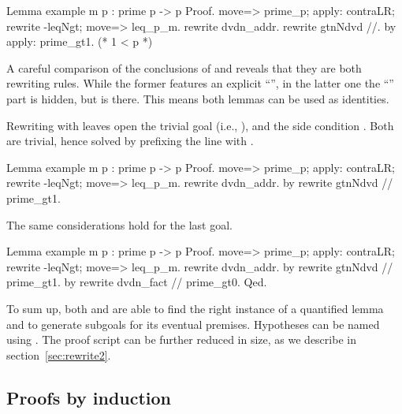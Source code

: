 \begin{coq}{}{}
Lemma example m p : prime p -> p %
Proof.
move=> prime_p; apply: contraLR; rewrite -leqNgt; move=> leq_p_m.
rewrite dvdn_addr.
  rewrite gtnNdvd //.
  by apply: prime_gt1.  (* 1 < p *)
\end{coq}
A careful comparison of the conclusions of 
and  reveals that they are both rewriting rules.  While
the former features an explicit ``'', in the
latter one the ``'' part is hidden, but is there.
This means
both lemmas can be used as identities.


Rewriting with
 leaves open the trivial goal  (i.e., ),
and the side condition .  Both are trivial, hence
solved by prefixing the line with .

\begin{coq}{}{}
Lemma example m p : prime p -> p %
Proof.
move=> prime_p; apply: contraLR; rewrite -leqNgt; move=> leq_p_m.
rewrite dvdn_addr.
  by rewrite gtnNdvd // prime_gt1.
\end{coq}
The same considerations hold for the last goal.

\begin{coq}{}{}
Lemma example m p : prime p -> p %
Proof.
move=> prime_p; apply: contraLR; rewrite -leqNgt; move=> leq_p_m.
rewrite dvdn_addr.
  by rewrite gtnNdvd // prime_gt1.
by rewrite dvdn_fact // prime_gt0.
Qed.
\end{coq}

To sum up, both  and  are able to find the right
instance of a quantified lemma and to generate subgoals
for its eventual premises.  Hypotheses can be named using .
The proof script can be further reduced in size, as we describe in
section~\ref{sec:rewrite2}.


\subsection{Proofs by induction}\label{ssec:ind}

